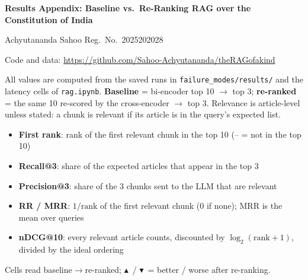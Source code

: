 \documentclass[10pt,a4paper]{article}
\newcommand{\up}{\textcolor{upc}{$\blacktriangle$}}
\newcommand{\down}{\textcolor{downc}{$\blacktriangledown$}}
\begin{document}
\begin{center}
{\Large\bfseries Results Appendix: Baseline vs.\ Re-Ranking RAG over the Constitution of India}\par\vspace{0.4em}
{Achyutananda Sahoo \quad\textbullet\quad Reg.\ No.\ 2025202028}\par\vspace{0.2em}
{\small Code and data: \url{https://github.com/Sahoo-Achyutananda/theRAGofakind}}\par
\end{center}
All values are computed from the saved runs in \texttt{failure\_modes/results/} and the latency cells of \texttt{rag.ipynb}. \textbf{Baseline} = bi-encoder top 10 $\to$ top 3; \textbf{re-ranked} = the same 10 re-scored by the cross-encoder $\to$ top 3. Relevance is article-level unless stated: a chunk is relevant if its article is in the query's expected list.
\begin{itemize}[nosep,leftmargin=1.2em]
\item \textbf{First rank}: rank of the first relevant chunk in the top 10 (-- = not in the top 10)
\item \textbf{Recall@3}: share of the expected articles that appear in the top 3
\item \textbf{Precision@3}: share of the 3 chunks sent to the LLM that are relevant
\item \textbf{RR / MRR}: $1/\text{rank}$ of the first relevant chunk (0 if none); MRR is the mean over queries
\item \textbf{nDCG@10}: every relevant article counts, discounted by $\log_2(\text{rank}+1)$, divided by the ideal ordering
\end{itemize}
Cells read baseline$\to$re-ranked; \up\ / \down\ = better / worse after re-ranking.
\end{document}
